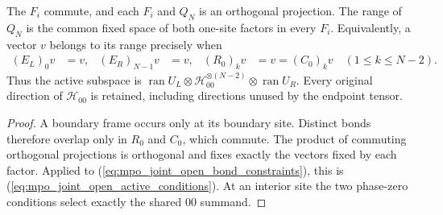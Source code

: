 \begin{theorem}
    \label{thm:mpo_joint_open_active_range}
    The $F_i$ commute, and each $F_i$ and $Q_N$ is an orthogonal projection.
    The range of $Q_N$ is the common fixed space of both one-site factors
    in every $F_i$. Equivalently, a vector $v$ belongs to its range precisely when
    \begin{align}
        (E_L)_0v & =v,                              & (E_R)_{N-1}v & =v, &
        (R_0)_kv & =v=(C_0)_kv\quad(1\le k\le N-2).
        \label{eq:mpo_joint_open_active_conditions}
    \end{align}
    Thus the active subspace is
    $\operatorname{ran}U_L\otimes\mathcal H_{00}^{\otimes(N-2)}
        \otimes\operatorname{ran}U_R$.
    Every original direction of $\mathcal H_{00}$ is retained,
    including directions unused by the endpoint tensor.
\end{theorem}
\begin{proof}
    A boundary frame occurs only at its boundary site. Distinct bonds
    therefore overlap only in $R_0$ and $C_0$, which commute.
    The product of commuting orthogonal projections is orthogonal and
    fixes exactly the vectors fixed by each factor.
    Applied to (\ref{eq:mpo_joint_open_bond_constraints}), this is
    (\ref{eq:mpo_joint_open_active_conditions}). At an interior site the
    two phase-zero conditions select exactly the shared $00$ summand.
\end{proof}

